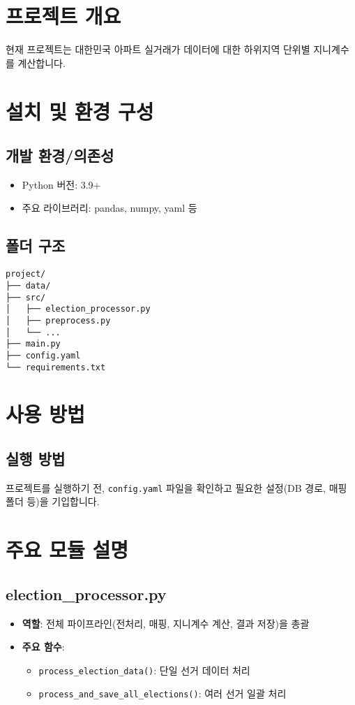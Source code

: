 \documentclass{article}
\begin{document}
\section{프로젝트 개요}
현재 프로젝트는 대한민국 아파트 실거래가 데이터에 대한 하위지역 단위별 지니계수를 계산합니다.

\section{설치 및 환경 구성}
\subsection{개발 환경/의존성}
\begin{itemize}
    \item Python 버전: 3.9+
    \item 주요 라이브러리: pandas, numpy, yaml 등
\end{itemize}

\subsection{폴더 구조}
\begin{verbatim}
project/
├── data/
├── src/
│   ├── election_processor.py
│   ├── preprocess.py
│   └── ...
├── main.py
├── config.yaml
└── requirements.txt
\end{verbatim}

\section{사용 방법}
\subsection{실행 방법}
프로젝트를 실행하기 전, \texttt{config.yaml} 파일을 확인하고 필요한 설정(DB 경로, 매핑 폴더 등)을 기입합니다.

\section{주요 모듈 설명}
\subsection{election\_processor.py}

\begin{itemize}
    \item \textbf{역할}: 전체 파이프라인(전처리, 매핑, 지니계수 계산, 결과 저장)을 총괄
    \item \textbf{주요 함수}:
    \begin{itemize}
        \item \texttt{process\_election\_data()}:
              단일 선거 데이터 처리
        \item \texttt{process\_and\_save\_all\_elections()}:
              여러 선거 일괄 처리
    \end{itemize}
\end{itemize}
\end{document}
